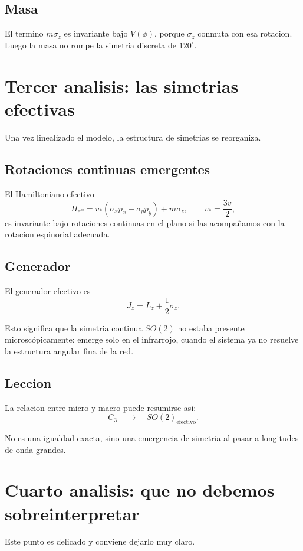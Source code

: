 \subsection{Masa}
El termino \(m\sigma_z\) es invariante bajo \(V(\phi)\), porque \(\sigma_z\) conmuta con esa rotacion. Luego la masa no rompe la simetria discreta de \(120^\circ\).

\section{Tercer analisis: las simetrias efectivas}
Una vez linealizado el modelo, la estructura de simetrias se reorganiza.

\subsection{Rotaciones continuas emergentes}
El Hamiltoniano efectivo
\begin{equation}
H_{\text{eff}} =
v_\ast(\sigma_x p_x + \sigma_y p_y)+m\sigma_z,
\qquad
v_\ast=\frac{3v}{2},
\end{equation}
es invariante bajo rotaciones continuas en el plano si las acompa\~namos con la rotacion espinorial adecuada.

\subsection{Generador}
El generador efectivo es
\begin{equation}
J_z = L_z + \frac{1}{2}\sigma_z.
\label{c05:eq:Jz}
\end{equation}

Esto significa que la simetria continua \(SO(2)\) no estaba presente microscópicamente: emerge solo en el infrarrojo, cuando el sistema ya no resuelve la estructura angular fina de la red.

\subsection{Leccion}
La relacion entre micro y macro puede resumirse asi:
\begin{equation}
C_3 \quad \longrightarrow \quad SO(2)_{\text{efectivo}}.
\end{equation}

No es una igualdad exacta, sino una emergencia de simetria al pasar a longitudes de onda grandes.

\section{Cuarto analisis: que no debemos sobreinterpretar}
Este punto es delicado y conviene dejarlo muy claro.

